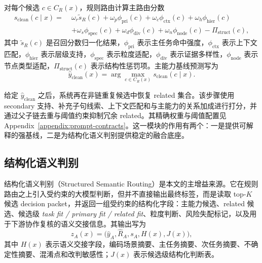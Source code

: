 \documentclass[11pt,a4paper]{ctexart}
\begin{document}
对每个候选 $c\in C_R(x)$，规则路由计算主路由分数
\begin{equation}
\label{eq:clean-primary}
\begin{aligned}
s_{\mathrm{clean}}(c\mid x)=\;&
\omega_r \tilde s_R(c)
+ \omega_p \phi_{\mathrm{pri}}(c)
+ \omega_c \phi_{\mathrm{ctx}}(c)
+ \omega_h \phi_{\mathrm{hier}}(c)\\
&+ \omega_s \phi_{\mathrm{spec}}(c)
+ \omega_d \phi_{\mathrm{div}}(c)
+ \omega_n \phi_{\mathrm{node}}(c)
- \Pi_{\mathrm{struct}}(c),
\end{aligned}
\end{equation}
其中 $\tilde s_R(c)$ 是召回分数归一化结果，$\phi_{\mathrm{pri}}$ 表示主任务命中强度，$\phi_{\mathrm{ctx}}$ 表示上下文匹配，$\phi_{\mathrm{hier}}$ 表示层级支持，$\phi_{\mathrm{spec}}$ 表示粒度适配，$\phi_{\mathrm{div}}$ 表示证据多样性，$\phi_{\mathrm{node}}$ 表示节点类型适配，$\Pi_{\mathrm{struct}}(c)$ 表示结构性惩罚项。主能力基线预测写为
\begin{equation}
\hat y_{\mathrm{clean}}(x)=\arg\max_{c\in C_R(x)} s_{\mathrm{clean}}(c\mid x).
\end{equation}

给定 $\hat y_{\mathrm{clean}}$ 之后，系统再在非链重复候选中恢复 related 集合。该步骤使用 secondary 支持、补充子句线索、上下文匹配和与主能力的关系加成进行打分，并通过父子链去重与阈值约束抑制冗余 related。其精确权重与阈值配置见 Appendix~\ref{appendix:prompt-contracts}。这一模块的作用有两个：一是提供可解释的强基线，二是为结构化语义判别提供稳定的融合底座。

\subsection{结构化语义判别}

结构化语义判别（Structured Semantic Routing）是本文的主增益来源。它在规则路由之上引入受约束的大模型判断，但并不直接输出最终标签，而是读取 top-$K$ 候选 decision packet，并返回一组受约束的结构化字段：主能力候选、related 候选、候选级 \emph{task fit / primary fit / related fit}、粒度判断、风险失配标记，以及用于下游协作复核的语义交接信息。其输出写为
\begin{equation}
z_A(x)=\bigl(\hat y_A,\hat R_A,s_A,H(x),J(x)\bigr),
\end{equation}
其中 $H(x)$ 表示语义交接字段，编码场景摘要、主任务摘要、次任务摘要、不确定性摘要、混淆点和改判敏感性；$J(x)$ 表示候选级结构化判断表。
\end{document}
